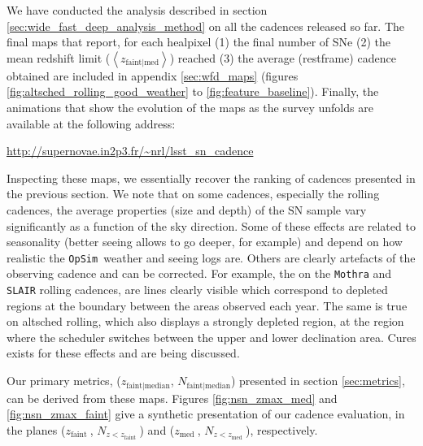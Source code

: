 \documentclass [11pt,a4paper]{article}
\newcommand{\zfaint}{$z_{\mathrm{faint}}\ $}
\newcommand{\nsnfaint}{$N_{z<z_{\mathrm{faint}}}\ $}
\newcommand{\zmed}{$z_{\mathrm{med}}\ $}
\newcommand{\nsnmed}{$N_{z<z_{\mathrm{med}}}\ $}
\newcommand{\opsim}{{\tt OpSim\ }}
\begin{document}
We have conducted the analysis described in section
\ref{sec:wide_fast_deep_analysis_method} on all the cadences released
so far.  The final maps that report, for each healpixel (1) the final
number of SNe (2) the mean redshift limit
($\left<z_{\mathrm{faint|med}}\right>$) reached (3) the average
(restframe) cadence obtained are included in appendix
\ref{sec:wfd_maps} (figures \ref{fig:altsched_rolling_good_weather} to
\ref{fig:feature_baseline}). Finally, the animations that show the evolution
of the maps as the survey unfolds are available at the following address:
\begin{center}
  \href{http://supernovae.in2p3.fr/~nrl/lsst_sn_cadence}{http://supernovae.in2p3.fr/\~{}nrl/lsst\_sn\_cadence}
\end{center}
Inspecting these maps, we essentially recover the ranking of cadences
presented in the previous section.  We note that on some cadences,
especially the rolling cadences, the average properties (size and
depth) of the SN sample vary significantly as a function of the sky
direction. Some of these effects are related to seasonality (better
seeing allows to go deeper, for example) and depend on how realistic
the \opsim weather and seeing logs are. Others are clearly artefacts
of the observing cadence and can be corrected. For example, the on the
{\tt Mothra} and {\tt SLAIR} rolling cadences, are lines clearly
visible which correspond to depleted regions at the boundary between
the areas observed each year. The same is true on altsched rolling,
which also displays a strongly depleted region, at the region where
the scheduler switches between the upper and lower declination area.
Cures exists for these effects and are being discussed. 

Our primary metrics, ($z_{\mathrm{faint|median}}$, $N_{\mathrm{faint|median}}$) 
presented in section \ref{sec:metrics}, can be derived from these
maps.  Figures \ref{fig:nsn_zmax_med} and \ref{fig:nsn_zmax_faint}
give a synthetic presentation of our cadence evaluation, in the planes
(\zfaint, \nsnfaint) and (\zmed, \nsnmed), respectively.
\end{document}
